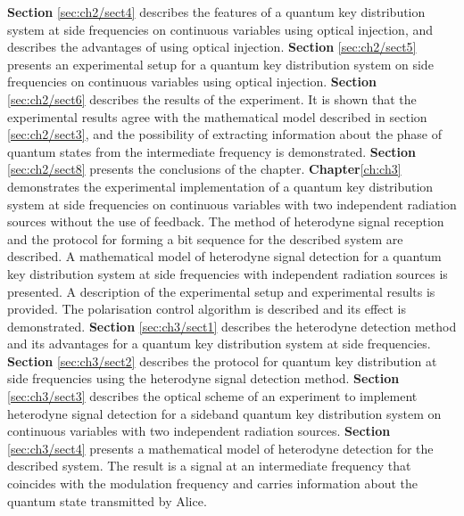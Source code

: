 \newline \textbf{Section} \ref{sec:ch2/sect4} describes the features of a quantum key distribution system at side frequencies on continuous variables using optical injection, and describes the advantages of using optical injection.
\newline \textbf{Section} \ref{sec:ch2/sect5} presents an experimental setup for a quantum key distribution system on side frequencies on continuous variables using optical injection.
\newline \textbf{Section} \ref{sec:ch2/sect6} describes the results of the experiment. It is shown that the experimental results agree with the mathematical model described in section \ref{sec:ch2/sect3}, and the possibility of extracting information about the phase of quantum states from the intermediate frequency is demonstrated.
\newline \textbf{Section} \ref{sec:ch2/sect8} presents the conclusions of the chapter.
\newline \textbf{Chapter}\ref{ch:ch3} demonstrates the experimental implementation of a quantum key distribution system at side frequencies on continuous variables with two independent radiation sources without the use of feedback. The method of heterodyne signal reception and the protocol for forming a bit sequence for the described system are described.  A mathematical model of heterodyne signal detection for a quantum key distribution system at side frequencies with independent radiation sources is presented. A description of the experimental setup and experimental results is provided. The polarisation control algorithm is described and its effect is demonstrated.
\newline \textbf{Section} \ref{sec:ch3/sect1} describes the heterodyne detection method and its advantages for a quantum key distribution system at side frequencies.
\newline \textbf{Section} \ref{sec:ch3/sect2} describes the protocol for quantum key distribution at side frequencies using the heterodyne signal detection method.
\newline \textbf{Section} \ref{sec:ch3/sect3} describes the optical scheme of an experiment to implement heterodyne signal detection for a sideband quantum key distribution system on continuous variables with two independent radiation sources.
\newline \textbf{Section} \ref{sec:ch3/sect4} presents a mathematical model of heterodyne detection for the described system. The result is a signal at an intermediate frequency that coincides with the modulation frequency and carries information about the quantum state transmitted by Alice.
